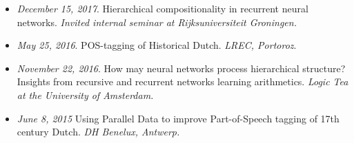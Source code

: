 \begin{itemize}
    \item \textit{December 15, 2017}. Hierarchical compositionality in recurrent neural networks. \textit{Invited internal seminar at Rijksuniversiteit Groningen.}
    \item \textit{May 25, 2016}. POS-tagging of Historical Dutch. \textit{LREC, Portoroz}.
    \item \textit{November 22, 2016}. How may neural networks process hierarchical structure? Insights from recursive and recurrent networks learning arithmetics. \textit{Logic Tea at the University of Amsterdam.}
    \item \textit{June 8, 2015} Using Parallel Data to improve Part-of-Speech tagging of 17th century Dutch. \textit{DH Benelux, Antwerp.}
\end{itemize}